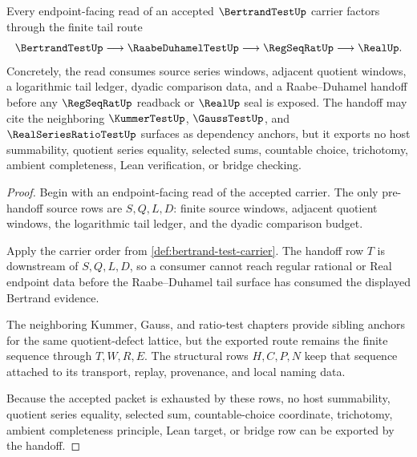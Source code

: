 \begin{theorem}
\label{thm:bertrand-test-raabe-tail-handoff}
Every endpoint-facing read of an accepted $\BertrandTestUp$ carrier factors through the finite tail route
$$
\BertrandTestUp \longrightarrow \RaabeDuhamelTestUp \longrightarrow \RegSeqRatUp \longrightarrow \RealUp .
$$
Concretely, the read consumes source series windows, adjacent quotient windows, a logarithmic tail ledger, dyadic comparison data, and a Raabe--Duhamel handoff before any $\RegSeqRatUp$ readback or $\RealUp$ seal is exposed. The handoff may cite the neighboring $\KummerTestUp$, $\GaussTestUp$, and $\RealSeriesRatioTestUp$ surfaces as dependency anchors, but it exports no host summability, quotient series equality, selected sums, countable choice, trichotomy, ambient completeness, Lean verification, or bridge checking.
\end{theorem}
\begin{proof}
Begin with an endpoint-facing read of the accepted carrier. The only pre-handoff source rows are $S,Q,L,D$: finite source windows, adjacent quotient windows, the logarithmic tail ledger, and the dyadic comparison budget.

Apply the carrier order from \autoref{def:bertrand-test-carrier}. The handoff row $T$ is downstream of $S,Q,L,D$, so a consumer cannot reach regular rational or Real endpoint data before the Raabe--Duhamel tail surface has consumed the displayed Bertrand evidence.

The neighboring Kummer, Gauss, and ratio-test chapters provide sibling anchors for the same quotient-defect lattice, but the exported route remains the finite sequence through $T,W,R,E$. The structural rows $H,C,P,N$ keep that sequence attached to its transport, replay, provenance, and local naming data.

Because the accepted packet is exhausted by these rows, no host summability, quotient series equality, selected sum, countable-choice coordinate, trichotomy, ambient completeness principle, Lean target, or bridge row can be exported by the handoff.
\end{proof}


